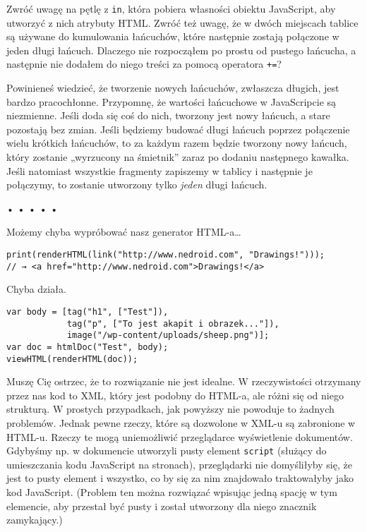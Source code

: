 Zwróć uwagę na pętlę z \texttt{in}, która pobiera własności obiektu JavaScript, aby utworzyć z nich atrybuty HTML. Zwróć też uwagę, że w dwóch miejscach tablice są używane do kumulowania łańcuchów, które następnie zostają połączone w jeden długi łańcuch. Dlaczego nie rozpocząłem po prostu od pustego łańcucha, a następnie nie dodałem do niego treści za pomocą operatora \texttt{+=}?

  
Powinieneś wiedzieć, że tworzenie nowych łańcuchów, zwłaszcza długich, jest bardzo pracochłonne. Przypomnę, że wartości łańcuchowe w JavaScripcie są niezmienne. Jeśli doda się coś do nich, tworzony jest nowy łańcuch, a stare pozostają bez zmian. Jeśli będziemy budować długi łańcuch poprzez połączenie wielu krótkich łańcuchów, to za każdym razem będzie tworzony nowy łańcuch, który zostanie „wyrzucony na śmietnik” zaraz po dodaniu następnego kawałka. Jeśli natomiast wszystkie fragmenty zapiszemy w tablicy i następnie je połączymy, to zostanie utworzony tylko \emph{jeden} długi łańcuch.



\begin{center}
• • • • •
\end{center}

  
Możemy chyba wypróbować nasz generator HTML-a…

  
\begin{verbatim} 
print(renderHTML(link("http://www.nedroid.com", "Drawings!")));
// → <a href="http://www.nedroid.com">Drawings!</a>
\end{verbatim}
  
Chyba działa.

  
\begin{verbatim} 
var body = [tag("h1", ["Test"]),
            tag("p", ["To jest akapit i obrazek..."]),
            image("/wp-content/uploads/sheep.png")];
var doc = htmlDoc("Test", body);
viewHTML(renderHTML(doc));
\end{verbatim}
  
Muszę Cię ostrzec, że to rozwiązanie nie jest idealne. W rzeczywistości otrzymany przez nas kod to XML, który jest podobny do HTML-a, ale różni się od niego strukturą. W prostych przypadkach, jak powyższy nie powoduje to żadnych problemów. Jednak pewne rzeczy, które są dozwolone w XML-u są zabronione w HTML-u. Rzeczy te mogą uniemożliwić przeglądarce wyświetlenie dokumentów. Gdybyśmy np. w dokumencie utworzyli pusty element \texttt{script} (służący do umieszczania kodu JavaScript na stronach), przeglądarki nie domyśliłyby się, że jest to pusty element i wszystko, co by się za nim znajdowało traktowałyby jako kod JavaScript. (Problem ten można rozwiązać wpisując jedną spację w tym elemencie, aby przestał być pusty i został utworzony dla niego znacznik zamykający.)



